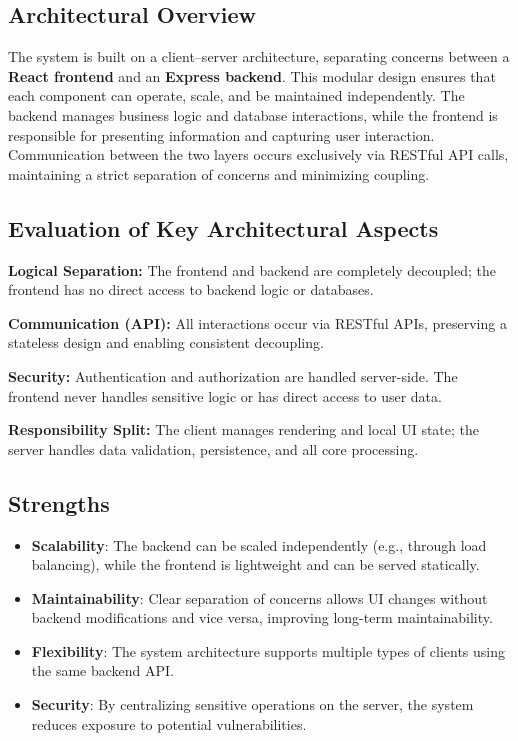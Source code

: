 \subsection{Architectural Overview}
The system is built on a client–server architecture, separating concerns between a \textbf{React frontend} and an \textbf{Express backend}. This modular design ensures that each component can operate, scale, and be maintained independently. The backend manages business logic and database interactions, while the frontend is responsible for presenting information and capturing user interaction. Communication between the two layers occurs exclusively via RESTful API calls, maintaining a strict separation of concerns and minimizing coupling.

\subsection{Evaluation of Key Architectural Aspects}

\textbf{Logical Separation:} The frontend and backend are completely decoupled; the frontend has no direct access to backend logic or databases.

\textbf{Communication (API):} All interactions occur via RESTful APIs, preserving a stateless design and enabling consistent decoupling.

\textbf{Security:} Authentication and authorization are handled server-side. The frontend never handles sensitive logic or has direct access to user data.

\textbf{Responsibility Split:} The client manages rendering and local UI state; the server handles data validation, persistence, and all core processing.

\subsection{Strengths}
\begin{itemize}
    \item \textbf{Scalability}: The backend can be scaled independently (e.g., through load balancing), while the frontend is lightweight and can be served statically.
    \item \textbf{Maintainability}: Clear separation of concerns allows UI changes without backend modifications and vice versa, improving long-term maintainability.
    \item \textbf{Flexibility}: The system architecture supports multiple types of clients using the same backend API.
    \item \textbf{Security}: By centralizing sensitive operations on the server, the system reduces exposure to potential vulnerabilities.
\end{itemize}

